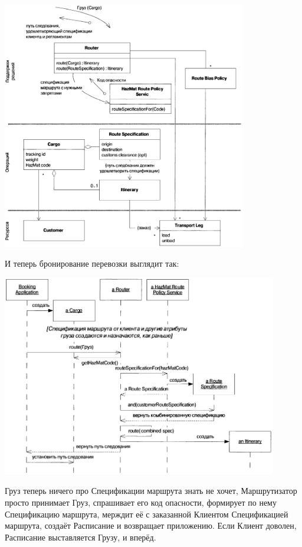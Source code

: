 \documentclass[a5paper]{article}
\begin{document}
\begin{center}
    \includegraphics[width=0.8\textwidth]{cargoHazMatOk.png}
\end{center}

И теперь бронирование перевозки выглядит так:

\begin{center}
    \includegraphics[width=0.9\textwidth]{cargoHazMatOkSequence.png}
\end{center}

Груз теперь ничего про Спецификации маршрута знать не хочет, Маршрутизатор просто принимает Груз, спрашивает его код опасности, формирует по нему Спецификацию маршрута, мерждит её с заказанной Клиентом Спецификацией маршрута, создаёт Расписание и возвращает приложению. Если Клиент доволен, Расписание выставляется Грузу, и вперёд.
\end{document}
